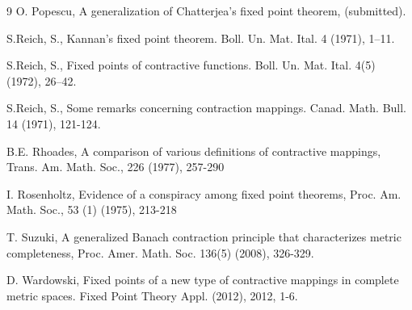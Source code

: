 \documentclass[12 pt]{article}
\theoremstyle{lema}
\theoremstyle{proposition}
\theoremstyle{theorem}
\theoremstyle{theorem}
\theoremstyle{corollary}
\theoremstyle{definition}
\theoremstyle{example}
\begin{document}
\begin{thebibliography}{9}
		O. Popescu, A generalization of Chatterjea's fixed point theorem, (submitted).
		
		S.Reich, S., Kannan's fixed point theorem. Boll. Un. Mat. Ital. 4 (1971), 1–11.
		
		S.Reich, S., Fixed points of contractive functions. Boll. Un. Mat. Ital. 4(5) (1972), 26–42.
		
		S.Reich, S., Some remarks concerning contraction mappings. Canad. Math. Bull. 14 (1971), 121-124.
		
		B.E. Rhoades, A comparison of various definitions of contractive mappings, Trans. Am. Math. Soc., 226 (1977), 257-290
		
		I. Rosenholtz, Evidence of a conspiracy among fixed point theorems, Proc. Am. Math. Soc., 53 (1) (1975), 213-218
		
		T. Suzuki, A generalized Banach contraction principle that characterizes metric completeness, Proc. Amer. Math. Soc. 136(5) (2008), 326-329.
		
		
		D. Wardowski, Fixed points of a new type of contractive mappings in complete metric spaces. Fixed Point Theory Appl. (2012), 2012, 1-6.	
		
		
		
		
	\end{thebibliography}
	\medskip
	\vspace{1.2ex}
	
\end{document}
